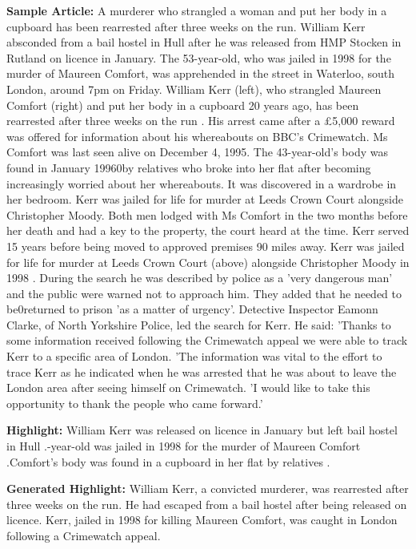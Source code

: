 \documentclass{article}
\begin{document}
\textbf{Sample Article:} A murderer who strangled a woman and put her body in a cupboard has been rearrested after three weeks on the run. William Kerr absconded from a bail hostel in Hull after he was released from HMP Stocken in Rutland on licence in January. The 53-year-old, who was jailed in 1998 for the murder of Maureen Comfort, was apprehended in the street in Waterloo, south London, around 7pm on Friday. William Kerr (left), who strangled Maureen Comfort (right) and put her body in a cupboard 20 years ago, has been rearrested after three weeks on the run . His arrest came after a £5,000 reward was offered for information about his whereabouts on BBC's Crimewatch. Ms Comfort was last seen alive on December 4, 1995. The 43-year-old's body was found in January 1996\xa0by relatives who broke into her flat after becoming increasingly worried about her whereabouts. It was discovered in a wardrobe in her bedroom. Kerr was jailed for life for murder at Leeds Crown Court alongside Christopher Moody. Both men lodged with Ms Comfort in the two months before her death and had a key to the property, the court heard at the time. Kerr served 15 years before being moved to approved premises 90 miles away. Kerr was jailed for life for murder at Leeds Crown Court (above) alongside Christopher Moody in 1998 . During the search he was described by police as a 'very dangerous man' and the public were warned not to approach him. They added that he needed to be\xa0returned to prison 'as a matter of urgency'. Detective Inspector Eamonn Clarke, of North Yorkshire Police,  led the search for Kerr. He said: 'Thanks to some information received following the Crimewatch appeal we were able to track Kerr to a specific area of London. 'The information was vital to the effort to trace Kerr as he indicated when he was arrested that he was about to leave the London area after seeing himself on Crimewatch. 'I would like to take this opportunity to thank the people who came forward.' 

\textbf{Highlight:} William Kerr was released on licence in January but left bail hostel in Hull .-year-old was jailed in 1998 for the murder of Maureen Comfort .\nMs Comfort's body was found in a cupboard in her flat by relatives .

\textbf{Generated Highlight:} William Kerr, a convicted murderer, was rearrested after three weeks on the run. He had escaped from a bail hostel after being released on licence. Kerr, jailed in 1998 for killing Maureen Comfort, was caught in London following a Crimewatch appeal.
\end{document}
